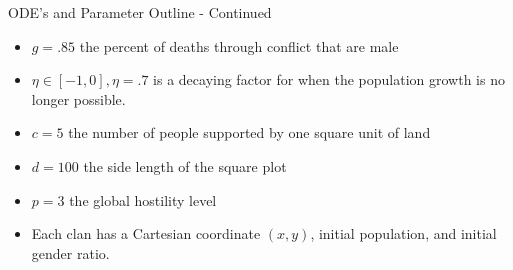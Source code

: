 \documentclass[t]{beamer}
\begin{document}
\begin{frame}
{ODE's and Parameter Outline - Continued}

\begin{itemize}
\item $g = .85$ the percent of deaths through conflict that are male
\\
\item $\eta \in [-1,0], \eta = .7$ is a decaying factor for when the population growth is no longer possible.
\item $c = 5$ the number of people supported by one square unit of land
\\
\item $d = 100$ the side length of the square plot
\\
\item $p = 3$ the global hostility level
\\
\item Each clan has a Cartesian coordinate $(x,y)$, initial population, and initial gender ratio.
\end{itemize}

\end{frame}

\end{document}
